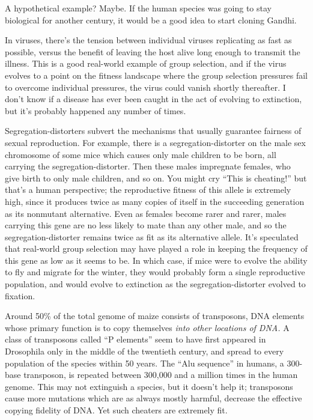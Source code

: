 {{
 A hypothetical example? Maybe. If the human species was going to
stay biological for another century, it would be a good idea to start
cloning Gandhi.}

{
 In viruses, there's the tension between individual
viruses replicating as fast as possible, versus the benefit of leaving
the host alive long enough to transmit the illness. This is a good
real-world example of group selection, and if the virus evolves to a
point on the fitness landscape where the group selection pressures fail
to overcome individual pressures, the virus could vanish shortly
thereafter. I don't know if a disease has ever been
caught in the act of evolving to extinction, but it's
probably happened any number of times.}

{
 Segregation-distorters subvert the mechanisms that usually
guarantee fairness of sexual reproduction. For example, there is a
segregation-distorter on the male sex chromosome of some mice which
causes only male children to be born, all carrying the
segregation-distorter. Then these males impregnate females, who give
birth to only male children, and so on. You might cry
``This is cheating!'' but
that's a human perspective; the reproductive fitness of
this allele is extremely high, since it produces twice as many copies
of itself in the succeeding generation as its nonmutant alternative.
Even as females become rarer and rarer, males carrying this gene are no
less likely to mate than any other male, and so the
segregation-distorter remains twice as fit as its alternative allele.
It's speculated that real-world group selection may
have played a role in keeping the frequency of this gene as low as it
seems to be. In which case, if mice were to evolve the ability to fly
and migrate for the winter, they would probably form a single
reproductive population, and would evolve to extinction as the
segregation-distorter evolved to fixation.}

{
 Around 50\% of the total genome of maize consists of transposons,
DNA elements whose primary function is to copy themselves \textit{into
other locations of DNA.} A class of transposons called
``P elements'' seem to have first
appeared in Drosophila only in the middle of the twentieth century, and
spread to every population of the species within 50 years. The
``Alu sequence'' in humans, a
300-base transposon, is repeated between 300,000 and a million times in
the human genome. This may not extinguish a species, but it
doesn't help it; transposons cause more mutations which
are as always mostly harmful, decrease the effective copying fidelity
of DNA. Yet such cheaters are extremely fit.}

}
